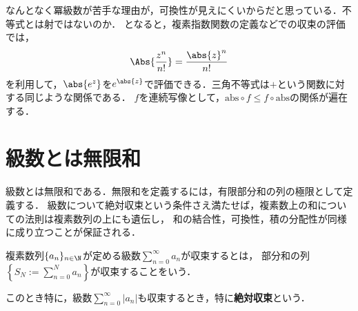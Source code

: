 \documentclass[uplatex, dvipdfmx]{jsreport}
\begin{document}
\begin{remark*}
    なんとなく冪級数が苦手な理由が，可換性が見えにくいからだと思っている．不等式とは射ではないのか．
    となると，複素指数関数の定義などでの収束の評価では，
    \[\Abs{\frac{z^n}{n!}}=\frac{\abs{z}^n}{n!}\]
    を利用して，$\abs{e^z}$を$e^{\abs{z}}$で評価できる．三角不等式は$+$という関数に対する同じような関係である．
    $f$を連続写像として，$\mathrm{abs}\circ f\le f\circ\mathrm{abs}$の関係が遍在する．
\end{remark*}

\section{級数とは無限和}

\begin{screen}
    級数とは無限和である．無限和を定義するには，有限部分和の列の極限として定義する．
    級数について絶対収束という条件さえ満たせば，複素数上の和についての法則は複素数列の上にも遺伝し，
    和の結合性，可換性，積の分配性が同様に成り立つことが保証される．
\end{screen}

\begin{definition}[級数の収束]
    複素数列$\{a_n\}_{n\in\N}$が定める級数$\sum_{n=0}^\infty a_n$が収束するとは，
    部分和の列$\left\{S_N:=\sum^N_{n=0}a_n\right\}$が収束することをいう．

    このとき特に，級数$\sum^\infty_{n=0}|a_n|$も収束するとき，特に\textbf{絶対収束}という．
\end{definition}
\end{document}
